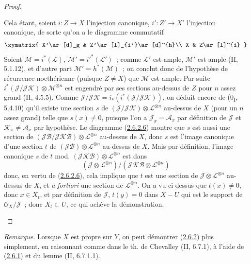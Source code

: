 \begin{proof}
\begin{env}[2.6.2.5]
Cela étant, soient $i:Z\to X$ l'injection canonique,
$i':Z'\to X'$ l'injection canonique, de sorte qu'on a le diagramme
commutatif
\[
\xymatrix{
X'\ar[d]_g & Z'\ar[l]_{i'}\ar[d]^{h}\\
X & Z\ar[l]^{i}
}
\]
Soient $\mathcal M=i^*(\mathcal L)$, $\mathcal M'=i'^*(\mathcal L')$~;
comme $\mathcal L'$ est ample, $\mathcal M'$ est ample (II, 5.1.12), et
d'autre part $\mathcal M'=h^*(\mathcal M)$~; on conclut donc de
l'hypothèse de récurrence noethérienne (puisque $Z\neq X$) que
$\mathcal M$ est ample. Par suite
$i^*(\mathcal J/\mathcal J\mathcal K)\otimes\mathcal M^{\otimes n}$ est
engendré par ses sections au-dessus de $Z$ pour $n$ assez grand
(II, 4.5.5). Comme
$\mathcal J/\mathcal J\mathcal K=i_*(i^*(\mathcal J/\mathcal J\mathcal K))$,
on déduit encore de (0\textsubscript{I}, 5.4.10) qu'il existe une section
$s$ de $(\mathcal J/\mathcal J\mathcal K)\otimes
\mathcal L^{\otimes n}$ au-dessus de $X$ (pour un $n$ assez grand) telle
que $s(x)\neq0$, puisque l'on a $\mathcal J_x=\mathcal A_x$ par
définition de $\mathcal J$ et $\mathcal K_x\neq\mathcal A_x$ par
hypothèse. Le diagramme (\hyperref[III.2.6.2.6-fr]{2.6.2.6}) montre que
$s$ est aussi une section de
$(\mathcal J\mathcal B/\mathcal J\mathcal K\mathcal B)
\otimes\mathcal L^{\otimes n}$ au-dessus de $X$, donc $s$ est l'image
canonique d'une section $t$ de
$(\mathcal J\mathcal B)\otimes\mathcal L^{\otimes n}$ au-dessus de $X$.
Mais par définition, l'image canonique $s$ de $t$ mod.
$(\mathcal J\mathcal K\mathcal B)\otimes\mathcal L^{\otimes n}$ est
dans
\[
(\mathcal J\otimes\mathcal L^{\otimes n})/
(\mathcal J\mathcal K\mathcal B\otimes\mathcal L^{\otimes n})
\]
donc, en vertu de (\hyperref[III.2.6.2.6-fr]{2.6.2.6}), cela implique que
$t$ est une section de $\mathcal J\otimes\mathcal L^{\otimes n}$
au-dessus de $X$, et \emph{a fortiori} une section de
$\mathcal L^{\otimes n}$. On a vu ci-dessus que $t(x)\neq0$, donc
$x\in X_t$, et par définition de $\mathcal J$, $t(y)=0$ dans $X-U$ qui
est le support de $\mathcal O_X/\mathcal J$~; donc $X_t\subset U$, ce qui
achève la démonstration.
\end{env}
\end{proof}

\begin{env}[2.6.3]
\label{III.2.6.3-fr}
\emph{Remarque.} Lorsque $X$ est propre sur $Y$, on peut démontrer
(\hyperref[III.2.6.2-fr]{2.6.2}) plus simplement, en raisonnant comme dans
le th. de Chevalley (II, 6.7.1), à l'aide de
(\hyperref[III.2.6.1-fr]{2.6.1}) et du lemme (II, 6.7.1.1).
\end{env}

